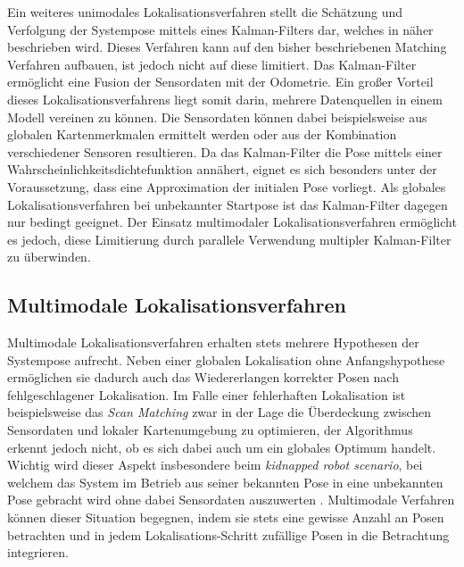 Ein weiteres unimodales Lokalisationsverfahren stellt die Schätzung und Verfolgung der Systempose mittels eines Kalman-Filters dar, welches in  näher beschrieben wird. Dieses Verfahren kann auf den bisher beschriebenen Matching Verfahren aufbauen, ist jedoch nicht auf diese limitiert. Das Kalman-Filter ermöglicht eine Fusion der Sensordaten mit der Odometrie. Ein großer Vorteil dieses Lokalisationsverfahrens liegt somit darin, mehrere Datenquellen in einem Modell vereinen zu können. Die Sensordaten können dabei beispielsweise aus globalen Kartenmerkmalen ermittelt werden \cite{Leonard1991} oder aus der Kombination verschiedener Sensoren \cite{Roumeliotis1997} resultieren. Da das Kalman-Filter die Pose mittels einer Wahrscheinlichkeitsdichtefunktion annähert, eignet es sich besonders unter der Voraussetzung, dass eine Approximation der initialen Pose vorliegt. Als globales Lokalisationsverfahren bei unbekannter Startpose ist das Kalman-Filter dagegen nur bedingt geeignet. Der Einsatz multimodaler Lokalisationsverfahren ermöglicht es jedoch, diese Limitierung durch parallele Verwendung multipler Kalman-Filter zu überwinden.

\subsection{Multimodale Lokalisationsverfahren}
Multimodale Lokalisationsverfahren erhalten stets mehrere Hypothesen der Systempose aufrecht. Neben einer globalen Lokalisation ohne Anfangshypothese ermöglichen sie dadurch auch das Wiedererlangen korrekter Posen nach fehlgeschlagener Lokalisation. Im Falle einer fehlerhaften Lokalisation ist beispielsweise das \textit{Scan Matching} zwar in der Lage die Überdeckung zwischen Sensordaten und lokaler Kartenumgebung zu optimieren, der Algorithmus erkennt jedoch nicht, ob es sich dabei auch um ein globales Optimum handelt. Wichtig wird dieser Aspekt insbesondere beim \textit{kidnapped robot scenario}, bei welchem das System im Betrieb aus seiner bekannten Pose in eine unbekannten Pose gebracht wird ohne dabei Sensordaten auszuwerten \cite{Yic2011}. Multimodale Verfahren können dieser Situation begegnen, indem sie stets eine gewisse Anzahl an Posen betrachten und in jedem Lokalisations-Schritt zufällige Posen in die Betrachtung integrieren.\\

